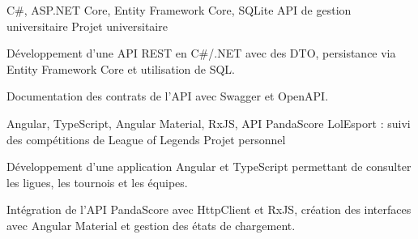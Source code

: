 
\begin{cventries}
  \cventry
    {C\#, ASP.NET Core, Entity Framework Core, SQLite}
    {API de gestion universitaire}
    {Projet universitaire}
    {}
    {
      \begin{cvitems}
        \item {Développement d’une API REST en C\#/.NET avec des DTO, persistance via Entity Framework Core et utilisation de SQL.}
        \item {Documentation des contrats de l’API avec Swagger et OpenAPI.}
      \end{cvitems}
    }

  \cventry
    {Angular, TypeScript, Angular Material, RxJS, API PandaScore}
    {LolEsport : suivi des compétitions de League of Legends}
    {Projet personnel}
    {}
    {
      \begin{cvitems}
        \item {Développement d’une application Angular et TypeScript permettant de consulter les ligues, les tournois et les équipes.}
        \item {Intégration de l’API PandaScore avec HttpClient et RxJS, création des interfaces avec Angular Material et gestion des états de chargement.}
      \end{cvitems}
    }
\end{cventries}
